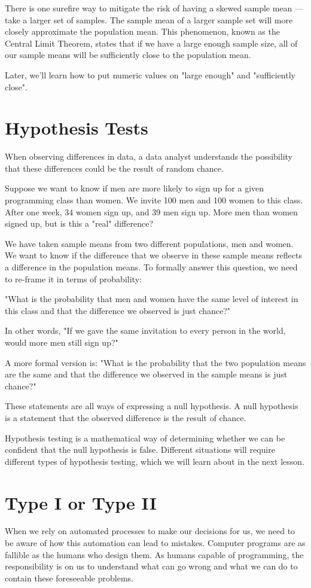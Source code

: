 \documentclass{journal}
\begin{document}
There is one surefire way to mitigate the risk of having a skewed sample mean — take a larger set of samples. The sample mean of a larger sample set will more closely approximate the population mean. This phenomenon, known as the Central Limit Theorem, states that if we have a large enough sample size, all of our sample means will be sufficiently close to the population mean.

Later, we'll learn how to put numeric values on "large enough" and "sufficiently close".

\section{Hypothesis Tests}
When observing differences in data, a data analyst understands the possibility that these differences could be the result of random chance.

Suppose we want to know if men are more likely to sign up for a given programming class than women. We invite 100 men and 100 women to this class. After one week, 34 women sign up, and 39 men sign up. More men than women signed up, but is this a "real" difference?

We have taken sample means from two different populations, men and women. We want to know if the difference that we observe in these sample means reflects a difference in the population means. To formally answer this question, we need to re-frame it in terms of probability:

"What is the probability that men and women have the same level of interest in this class and that the difference we observed is just chance?"

In other words, "If we gave the same invitation to every person in the world, would more men still sign up?"

A more formal version is: "What is the probability that the two population means are the same and that the difference we observed in the sample means is just chance?"

These statements are all ways of expressing a null hypothesis. A null hypothesis is a statement that the observed difference is the result of chance.

Hypothesis testing is a mathematical way of determining whether we can be confident that the null hypothesis is false. Different situations will require different types of hypothesis testing, which we will learn about in the next lesson.

\section{Type I or Type II}
When we rely on automated processes to make our decisions for us, we need to be aware of how this automation can lead to mistakes. Computer programs are as fallible as the humans who design them. As humans capable of programming, the responsibility is on us to understand what can go wrong and what we can do to contain these foreseeable problems.
\end{document}
